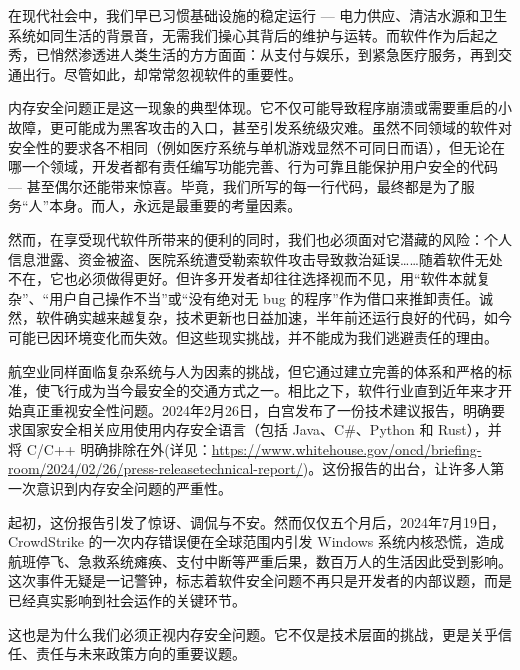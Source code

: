 在现代社会中，我们早已习惯基础设施的稳定运行 --- 电力供应、清洁水源和卫生系统如同生活的背景音，无需我们操心其背后的维护与运转。而软件作为后起之秀，已悄然渗透进人类生活的方方面面：从支付与娱乐，到紧急医疗服务，再到交通出行。尽管如此，却常常忽视软件的重要性。

内存安全问题正是这一现象的典型体现。它不仅可能导致程序崩溃或需要重启的小故障，更可能成为黑客攻击的入口，甚至引发系统级灾难。虽然不同领域的软件对安全性的要求各不相同（例如医疗系统与单机游戏显然不可同日而语），但无论在哪一个领域，开发者都有责任编写功能完善、行为可靠且能保护用户安全的代码 --- 甚至偶尔还能带来惊喜。毕竟，我们所写的每一行代码，最终都是为了服务“人”本身。而人，永远是最重要的考量因素。

然而，在享受现代软件所带来的便利的同时，我们也必须面对它潜藏的风险：个人信息泄露、资金被盗、医院系统遭受勒索软件攻击导致救治延误……随着软件无处不在，它也必须做得更好。但许多开发者却往往选择视而不见，用“软件本就复杂”、“用户自己操作不当”或“没有绝对无 bug 的程序”作为借口来推卸责任。诚然，软件确实越来越复杂，技术更新也日益加速，半年前还运行良好的代码，如今可能已因环境变化而失效。但这些现实挑战，并不能成为我们逃避责任的理由。

航空业同样面临复杂系统与人为因素的挑战，但它通过建立完善的体系和严格的标准，使飞行成为当今最安全的交通方式之一。相比之下，软件行业直到近年来才开始真正重视安全性问题。2024年2月26日，白宫发布了一份技术建议报告，明确要求国家安全相关应用使用内存安全语言（包括 Java、C\#、Python 和 Rust），并将 C/C++ 明确排除在外(详见：\url{https://www.whitehouse.gov/oncd/briefing-room/2024/02/26/press-releasetechnical-report/})。这份报告的出台，让许多人第一次意识到内存安全问题的严重性。

起初，这份报告引发了惊讶、调侃与不安。然而仅仅五个月后，2024年7月19日，CrowdStrike 的一次内存错误便在全球范围内引发 Windows 系统内核恐慌，造成航班停飞、急救系统瘫痪、支付中断等严重后果，数百万人的生活因此受到影响。这次事件无疑是一记警钟，标志着软件安全问题不再只是开发者的内部议题，而是已经真实影响到社会运作的关键环节。

这也是为什么我们必须正视内存安全问题。它不仅是技术层面的挑战，更是关乎信任、责任与未来政策方向的重要议题。
